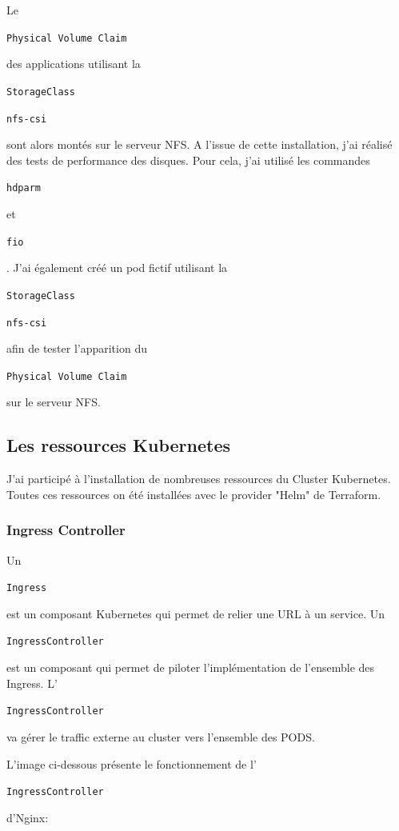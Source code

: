 \documentclass[12pt, a4paper, twoside]{article}
\begin{document}
Le \begin{code}\texttt{Physical Volume Claim}\end{code} des applications utilisant la \begin{code}\texttt{StorageClass}\end{code} \begin{code}\texttt{nfs-csi}\end{code} sont alors montés sur le serveur \gls{NFS}.
A l'issue de cette installation, j'ai réalisé des tests de performance des disques.
Pour cela, j'ai utilisé les commandes \begin{code}\texttt{hdparm}\end{code} et \begin{code}\texttt{fio}\end{code}.
J'ai également créé un pod fictif utilisant la \begin{code}\texttt{StorageClass}\end{code} \begin{code}\texttt{nfs-csi}\end{code} afin de tester l'apparition du \begin{code}\texttt{Physical Volume Claim}\end{code} sur le serveur \gls{NFS}.

\subsection{Les ressources Kubernetes}
J'ai participé à l'installation de nombreuses ressources du Cluster \gls{Kubernetes}.
Toutes ces ressources on été installées avec le provider "Helm" de \gls{Terraform}.

\subsubsection{Ingress Controller}
Un \begin{code}\texttt{Ingress}\end{code} est un composant \gls{Kubernetes} qui permet de relier une URL à un service.
Un \begin{code}\texttt{IngressController}\end{code} est un composant qui permet de piloter l'implémentation de l'ensemble des Ingress.
L'\begin{code}\texttt{IngressController}\end{code} va gérer le traffic externe au \gls{cluster} vers l'ensemble des PODS.

L'image ci-dessous présente le fonctionnement de l'\begin{code}\texttt{IngressController}\end{code} d'Nginx:
\end{document}

